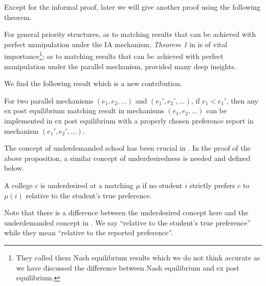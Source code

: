 Except for the informal proof, later we will give another proof using the following theorem.
 

For general priority structures, as to matching results that can be
achieved with perfect manipulation under the IA mechanism, \emph{Theorem 1} in \parencite{Ergin2006} is of vital importance\footnote{They called them Nash equilibrium results which we do not think accurate as we have discussed the difference between Nash equilibrium and ex post equilibrium.}; as to matching
results that can be achieved with perfect manipulation under the
parallel mechanism,  \parencite{YanChenJPE} provided many deep insights.

We find the following result which is a new contribution.

\begin{thm}
  \label{expost-equilibrium}
  For two parallel mechanisms $(e_1,e_2,...)$ and $(e_1',e_2',...)$, if $e_1 < e_1'$, then any ex post equilibrium matching result in mechanisms $(e_1,e_2,...)$ can be implemented in ex post equilibrium with a properly chosen preference report in mechanism $(e_1',e_2',...)$.
\end{thm}

The concept of underdemanded school has been crucial in \parencite{Qianfeng2014}.
In the proof of the above proposition, a similar concept of underdesiredness is needed and defined below.
\begin{definition}
  A college $c$ is underdesired at a matching $\mu$ if no student $i$ strictly prefers $c$ to $\mu(i)$ relative to the student's true preference.
\end{definition}

Note that there is a difference between the underdesired concept here and the underdemanded concept in  \parencite{Qianfeng2014}. We say ``relative to the student's true preference'' while they mean ``relative to the reported preference''.

